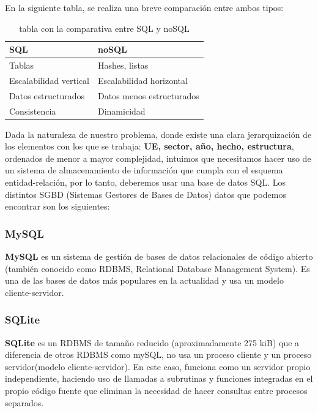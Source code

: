 En la siguiente tabla, se realiza una breve comparación entre ambos tipos: 

    \begin{table}[H]
        \begin{center}
            \begin{tabular}{ |l|l| } \hline
                \textbf{SQL} & \textbf{noSQL} \\ \hline
                Tablas & Hashes, listas \\
                Escalabilidad vertical & Escalabilidad horizontal \\
                Datos estructurados & Datos menos estructurados \\ 
                Consistencia & Dinamicidad \\ \hline
            \end{tabular}
            \caption{tabla con la comparativa entre SQL y noSQL}
            \label{tab:databases}
        \end{center}
    \end{table}

Dada la naturaleza de nuestro problema, donde existe una clara jerarquización de los
elementos con los que se trabaja: \textbf{UE, sector, año, hecho, estructura}, ordenados
de menor a mayor complejidad, intuimos que necesitamos hacer uso de un sistema de
almacenamiento de información que cumpla con el esquema entidad-relación, por lo tanto,
deberemos usar una base de datos SQL. Los distintos SGBD (Sistemas Gestores de Bases de
Datos) datos que podemos encontrar son los siguientes:

    \subsubsection{MySQL}
    \textbf{MySQL} \cite{mysql} es un sistema de gestión de bases de datos relacionales de
    código abierto (también conocido como RDBMS, Relational Database Management System). Es
    una de las bases de datos más populares en la actualidad y usa un modelo
    cliente-servidor.
    

    \subsubsection{SQLite}
    \textbf{SQLite} \cite{sqlite} es un RDBMS de tamaño reducido (aproximadamente 275 kiB)
    que a diferencia de otros RDBMS como mySQL, no usa un proceso cliente y un proceso
    servidor(modelo cliente-servidor). En este caso, funciona como un servidor
    propio independiente, haciendo uso de llamadas a subrutinas y funciones integradas en el
    propio código fuente que eliminan la necesidad de hacer consultas entre procesos
    separados.

